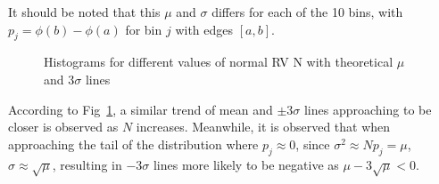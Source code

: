 \documentclass[11pt, twocolumn]{article}
\begin{document}
It should be noted that this $\mu$ and $\sigma$ differs for each of the 10 bins, with $p_j=\phi(b)-\phi(a)$ for bin $j$ with edges $[a,b]$.
\begin{figure}[htbp]
    \centering
    \vspace{-1em}

    \vspace{-1.1em}

    \vspace{-1.1em}
    \caption{Histograms for different values of normal RV N with theoretical $\mu$ and 3$\sigma$ lines}
    \label{fig:q1_6}
\end{figure}

According to Fig~\ref{fig:q1_6}, a similar trend of mean and $\pm 3\sigma$ lines approaching to be closer is observed as $N$ increases. 
Meanwhile, it is observed that when approaching the tail of the distribution where $p_j\approx 0$, since $\sigma^2\approx N{p_j}=\mu$, $\sigma\approx \sqrt{\mu}$, resulting in $-3\sigma$ lines more likely to be negative as $\mu-3\sqrt{\mu}<0$.
\end{document}
